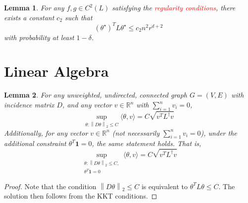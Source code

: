 \documentclass{article}
\newcommand{\Reals}{\mathbb{R}}
\newcommand{\norm}[1]{\left\lVert#1\right\rVert}
\newcommand{\dotp}[2]{\langle #1, #2 \rangle}
\newcommand{\1}{\mathbb{I}}
\newcommand{\Linv}{L^{\dagger}}
\newcommand{\thetast}{\theta^{\star}}
\theoremstyle{alden}
\theoremstyle{aldenthm}
\newtheorem{lemma}{Lemma}
\theoremstyle{definition}
\theoremstyle{remark}
\begin{document}
\begin{lemma}
	\label{lem: witness_discrete_energy}
	For any $f, g \in C^2(L)$ satisfying the \textcolor{red}{regularity conditions}, there exists a constant $c_2$ such that
	\begin{equation*}
	(\thetast)^T L \thetast \leq c_2 n^2 r^{d + 2}
	\end{equation*}
	with probability at least $1 - \delta$.
\end{lemma}

\section{Linear Algebra}

\begin{lemma}
	\label{lem: closed_form_ls_statistic}
	For any unweighted, undirected, connected graph $G = (V,E)$ with incidence matrix $D$, and any vector $v \in \Reals^n$ with $\sum_{i = 1}^{n} v_i = 0$,
	\begin{equation*}
	\sup_{\theta: \norm{D\theta}_2 \leq C} \dotp{\theta}{v} = C \sqrt{v^T \Linv v}
	\end{equation*}
	Additionally, for any vector $v \in \Reals^n$ (not necessarily $\sum_{i = 1}^{n} v_i = 0$), under the additional constraint $\theta^T \mathbf{1} = 0$, the same statement holds. That is,
	\begin{equation*}
	\sup_{ \substack{\theta: \norm{D\theta}_2 \leq C, \\ \theta^T \mathbf{1} = 0} } \dotp{\theta}{v} = C \sqrt{v^T \Linv v}
	\end{equation*}
\end{lemma}
\begin{proof}
	Note that the condition $\norm{D \theta}_2 \leq C$ is equivalent to $\theta^T L \theta \leq C$. The solution then follows from the KKT conditions.
\end{proof}
\end{document}
